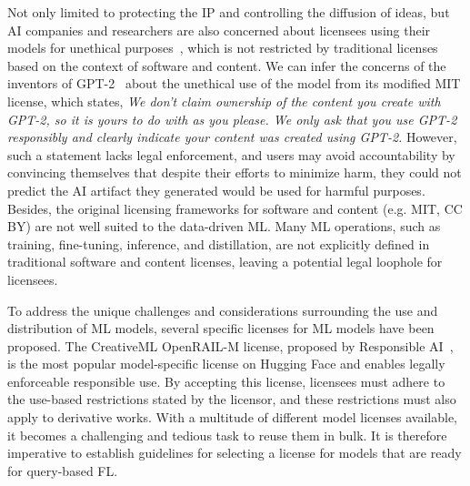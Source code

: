 Not only limited to protecting the IP and controlling the diffusion of ideas, but AI companies and researchers are also concerned about licensees using their models for unethical purposes~\cite{jobin2019global, awad2018moral, yuste2017four}, which is not restricted by traditional licenses based on the context of software and content.
We can infer the concerns of the inventors of GPT-2~\cite{radford2019language} about the unethical use of the model from its modified MIT license, which states, \textit{We don't claim ownership of the content you create with GPT-2, so it is yours to do with as you please. We only ask that you use GPT-2 responsibly and clearly indicate your content was created using GPT-2.} 
However, such a statement lacks legal enforcement, and users may avoid accountability by convincing themselves that despite their efforts to minimize harm, they could not predict the AI artifact they generated would be used for harmful purposes.
Besides, the original licensing frameworks for software and content (e.g. MIT, CC BY) are not well suited to the data-driven ML. 
Many ML operations, such as training, fine-tuning, inference, and distillation, are not explicitly defined in traditional software and content licenses, leaving a potential legal loophole for licensees.

To address the unique challenges and considerations surrounding the use and distribution of ML models, several specific licenses for ML models have been proposed. 
The CreativeML OpenRAIL-M license, proposed by Responsible AI~\cite{contractor2022behavioral}, is the most popular model-specific license on Hugging Face and enables legally enforceable responsible use.
By accepting this license, licensees must adhere to the use-based restrictions stated by the licensor, and these restrictions must also apply to derivative works.
With a multitude of different model licenses available, it becomes a challenging and tedious task to reuse them in bulk. 
It is therefore imperative to establish guidelines for selecting a license for models that are ready for query-based FL.

